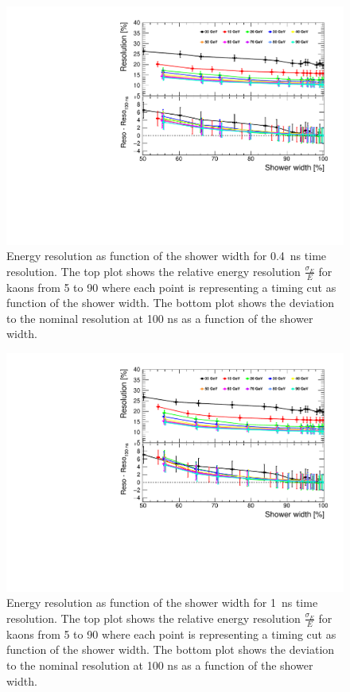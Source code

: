 \begin{figure}[htbp!]
  \centering
  \includegraphics[width=0.7\linewidth]{../Thesis_Plots/ILD/Smearing_0.4ns/Plots/ShowerWidth_Resolution_Smearing1}
  \caption{Energy resolution as function of the shower width for \SI{0.4}{\nano\second} time resolution. The top plot shows the relative energy resolution $\frac{\sigma_{E}}{E}$ for kaons from 5 to 90 \GeV where each point is representing a timing cut as function of the shower width. The bottom plot shows the deviation to the nominal resolution at 100 ns as a function of the shower width.} \label{fig:WidthReso0.4ns}
\end{figure}

\begin{figure}[htbp!]
  \centering
  \includegraphics[width=0.7\linewidth]{../Thesis_Plots/ILD/Smearing_1ns/Plots/ShowerWidth_Resolution_Smearing2}
  \caption{Energy resolution as function of the shower width for \SI{1}{\nano\second} time resolution. The top plot shows the relative energy resolution $\frac{\sigma_{E}}{E}$ for kaons from 5 to 90 \GeV where each point is representing a timing cut as function of the shower width. The bottom plot shows the deviation to the nominal resolution at 100 ns as a function of the shower width.} \label{fig:WidthReso1ns}
\end{figure}

